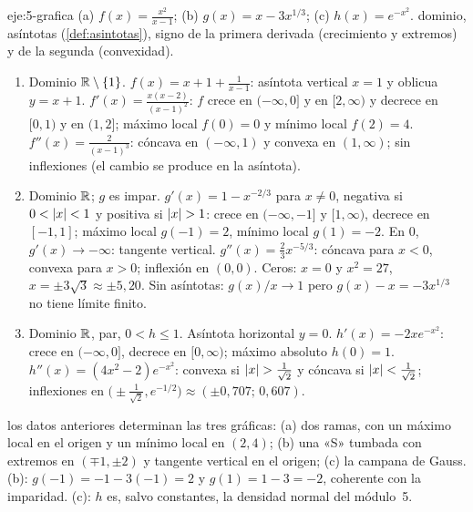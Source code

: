 \begin{solucion}{eje:5-grafica}
\datos (a) $f(x)=\frac{x^{2}}{x-1}$; (b) $g(x)=x-3x^{1/3}$; (c) $h(x)=e^{-x^{2}}$.
\planteamiento dominio, asíntotas (\cref{def:asintotas}), signo de la primera derivada (crecimiento y extremos) y de la segunda (convexidad).
\pasos
\begin{enumerate}[label=(\alph*)]
  \item Dominio $\mathbb{R}\setminus\{1\}$. $f(x)=x+1+\frac{1}{x-1}$: asíntota vertical $x=1$ y oblicua $y=x+1$. $f'(x)=\frac{x(x-2)}{(x-1)^{2}}$: $f$ crece en $(-\infty,0]$ y en $[2,\infty)$ y decrece en $[0,1)$ y en $(1,2]$; máximo local $f(0)=0$ y mínimo local $f(2)=4$. $f''(x)=\frac{2}{(x-1)^{3}}$: cóncava en $(-\infty,1)$ y convexa en $(1,\infty)$; sin inflexiones (el cambio se produce en la asíntota).
  \item Dominio $\mathbb{R}$; $g$ es impar. $g'(x)=1-x^{-2/3}$ para $x\ne0$, negativa si $0<\lvert x\rvert<1$ y positiva si $\lvert x\rvert>1$: crece en $(-\infty,-1]$ y $[1,\infty)$, decrece en $[-1,1]$; máximo local $g(-1)=2$, mínimo local $g(1)=-2$. En $0$, $g'(x)\to-\infty$: tangente vertical. $g''(x)=\frac23x^{-5/3}$: cóncava para $x<0$, convexa para $x>0$; inflexión en $(0,0)$. Ceros: $x=0$ y $x^{2}=27$, $x=\pm3\sqrt3\approx\pm5{,}20$. Sin asíntotas: $g(x)/x\to1$ pero $g(x)-x=-3x^{1/3}$ no tiene límite finito.
  \item Dominio $\mathbb{R}$, par, $0<h\le1$. Asíntota horizontal $y=0$. $h'(x)=-2xe^{-x^{2}}$: crece en $(-\infty,0]$, decrece en $[0,\infty)$; máximo absoluto $h(0)=1$. $h''(x)=(4x^{2}-2)e^{-x^{2}}$: convexa si $\lvert x\rvert>\frac{1}{\sqrt2}$ y cóncava si $\lvert x\rvert<\frac{1}{\sqrt2}$; inflexiones en $\bigl(\pm\frac{1}{\sqrt2},e^{-1/2}\bigr)\approx(\pm0{,}707;\,0{,}607)$.
\end{enumerate}
\resultado los datos anteriores determinan las tres gráficas: (a) dos ramas, con un máximo local en el origen y un mínimo local en $(2,4)$; (b) una «S» tumbada con extremos en $(\mp1,\pm2)$ y tangente vertical en el origen; (c) la campana de Gauss.
\comprobacion (b): $g(-1)=-1-3(-1)=2$ y $g(1)=1-3=-2$, coherente con la imparidad. (c): $h$ es, salvo constantes, la densidad normal del módulo~5.
\end{solucion}

